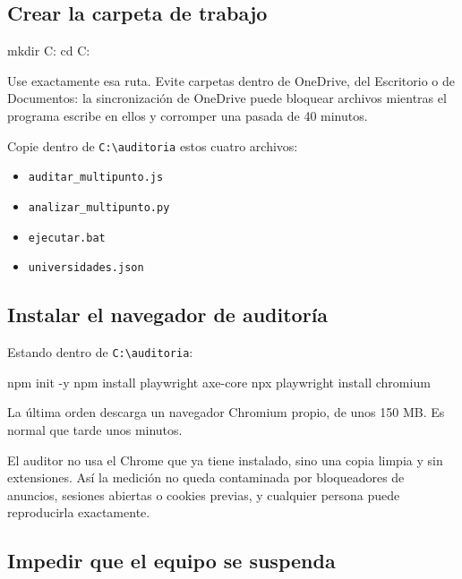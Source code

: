 \documentclass[11pt,a4paper]{article}
\begin{document}
\subsection{Crear la carpeta de trabajo}

\begin{orden}
mkdir C:\auditoria
cd C:\auditoria
\end{orden}

\begin{aviso}
	Use exactamente esa ruta. Evite carpetas dentro de OneDrive, del Escritorio o de \textsf{Documentos}: la sincronización de OneDrive puede bloquear archivos mientras el programa escribe en ellos y corromper una pasada de 40 minutos.
\end{aviso}

Copie dentro de \texttt{C:\textbackslash auditoria} estos cuatro archivos:

\begin{itemize}
	\item \texttt{auditar\_multipunto.js}
	\item \texttt{analizar\_multipunto.py}
	\item \texttt{ejecutar.bat}
	\item \texttt{universidades.json}
\end{itemize}

\subsection{Instalar el navegador de auditoría}

Estando dentro de \texttt{C:\textbackslash auditoria}:

\begin{orden}
npm init -y
npm install playwright axe-core
npx playwright install chromium
\end{orden}

La última orden descarga un navegador Chromium propio, de unos 150 MB. Es normal que tarde unos minutos.

\begin{nota}
	El auditor no usa el Chrome que ya tiene instalado, sino una copia limpia y sin extensiones. Así la medición no queda contaminada por bloqueadores de anuncios, sesiones abiertas o cookies previas, y cualquier persona puede reproducirla exactamente.
\end{nota}

\subsection{Impedir que el equipo se suspenda}\label{sub:suspension}
\end{document}
